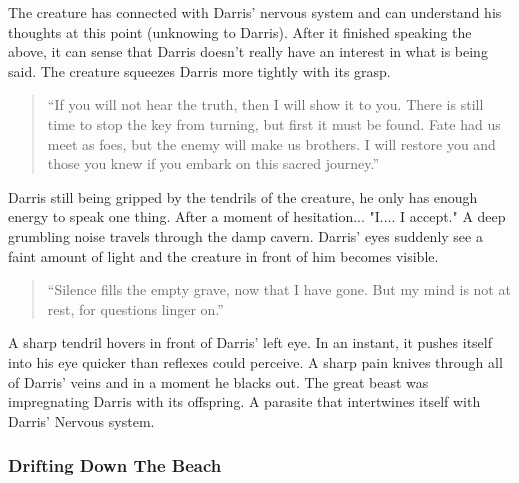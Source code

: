 The creature has connected with Darris' nervous system and can understand his thoughts at this point (unknowing to Darris). After it finished speaking the above, it can sense that Darris doesn't really have an interest in what is being said. The creature squeezes Darris more tightly with its grasp.

\begin{quote}
	``If you will not hear the truth, then I will show it to you. There is still time to stop the key from turning, but first it must be found. Fate had us meet as foes, but the enemy will make us brothers. I will restore you and those you knew if you embark on this sacred journey.''
\end{quote}

Darris still being gripped by the tendrils of the creature, he only has enough energy to speak one thing. After a moment of hesitation... "I.... I accept." A deep grumbling noise travels through the damp cavern. Darris' eyes suddenly see a faint amount of light and the creature in front of him becomes visible. 

\begin{quote}
	``Silence fills the empty grave, now that I have gone. But my mind is not at rest, for questions linger on.''
\end{quote}

A sharp tendril hovers in front of Darris' left eye. In an instant, it pushes itself into his eye quicker than reflexes could perceive. A sharp pain knives through all of Darris' veins and in a moment he blacks out. The great beast was impregnating Darris with its offspring. A parasite that intertwines itself with Darris' Nervous system.

\subsubsection{Drifting Down The Beach}

